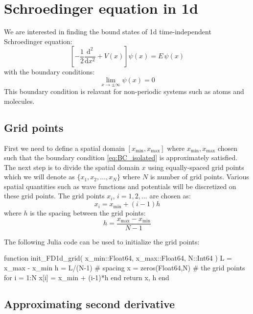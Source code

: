 \section{Schroedinger equation in 1d}

We are interested in finding the bound states of 1d time-independent Schroedinger equation:
\begin{equation}
\left[ -\frac{1}{2}\frac{\mathrm{d}^2}{\mathrm{d}x^2} + V(x) \right] \psi(x) = E\, \psi(x)
\label{eq:Sch_1d_eq}
\end{equation}
%
with the boundary conditions:
%
\begin{equation}
\lim_{x \rightarrow \pm \infty} \psi(x) = 0
\label{eq:BC_isolated}
\end{equation}
%
This boundary condition is relavant for non-periodic systems such as atoms and molecules.

\subsection{Grid points}

First we need to define a spatial domain $\left[x_{\mathrm{min}}, x_{\mathrm{max}}\right]$
where $x_{\mathrm{min}}, x_{\mathrm{max}}$ chosen
such that the boundary condition \ref{eq:BC_isolated} is approximately satisfied.
The next step is to divide the spatial domain $x$ using equally-spaced grid points
which we will denote as $\{x_{1},x_{2},\ldots,x_{N}\}$ where $N$ is number
of grid points. Various spatial quantities such as wave functions and potentials will be discretized
on these grid points.
The grid points $x_{i}$, $i = 1, 2, \ldots$ are chosen as:
\begin{equation}
x_{i} = x_{\mathrm{min}} + (i-1)h
\end{equation}
where $h$ is the spacing between the grid points:
\begin{equation}
h = \frac{ x_{\mathrm{max}} - x_{\mathrm{min}} }{N-1}
\end{equation}

The following Julia code can be used to initialize the grid points:
\begin{juliacode}
function init_FD1d_grid( x_min::Float64, x_max::Float64, N::Int64 )
    L = x_max - x_min
    h = L/(N-1) # spacing
    x = zeros(Float64,N) # the grid points
    for i = 1:N
        x[i] = x_min + (i-1)*h
    end
    return x, h
end
\end{juliacode}

\subsection{Approximating second derivative}

